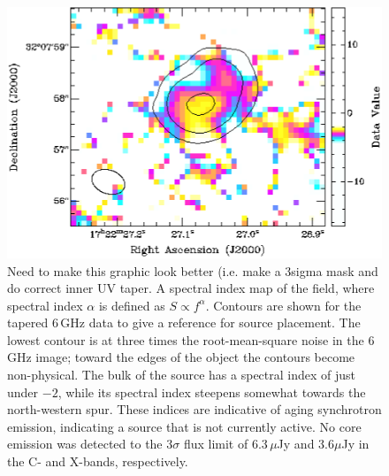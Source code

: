 \documentclass[useAMS,usenatbib]{emulateapj}
\newcommand{\fixme}[1]{{\color{red} #1 }}
\begin{document}
\begin{figure}
\centering
\includegraphics[trim=0mm 0cm 8mm 0mm,clip,width=0.95\columnwidth]{figs/spix.png}
\caption{\fixme{Need to make this graphic look better (i.e. make a 3sigma mask and do correct inner UV taper.} A spectral index map of the field, where spectral index $\alpha$ is defined as $S\propto f^{\alpha}$. Contours are shown for the tapered 6\,GHz data to give a reference for source placement. The lowest contour is at three times the root-mean-square noise in the 6\,GHz image; toward the edges of the object the contours become non-physical. The bulk of the source has a spectral index of just under $-2$, while its spectral index steepens somewhat towards the north-western spur. These indices are indicative of aging synchrotron emission, indicating a source that is not currently active. No core emission was detected to the 3$\sigma$ flux limit of 6.3\,$\mu$Jy and 3.6$\mu$Jy in the C- and X-bands, respectively.}\label{fig:spix}
\label{fig:last}
\vspace{1mm}
\end{figure}
\end{document}
